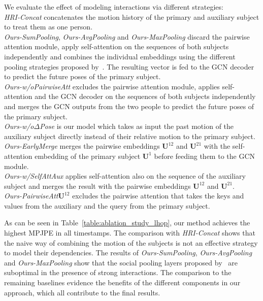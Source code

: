We evaluate the effect of modeling interactions via different strategies: \\
\textit{HRI-Concat} concatenates the motion history of the primary and auxiliary subject to treat them as one person. \\
\textit{Ours-SumPooling}, \textit{Ours-AvgPooling} and \textit{Ours-MaxPooling} discard the pairwise attention module, apply self-attention on the sequences of both subjects independently and combines the individual embeddings using the different pooling strategies proposed by~\cite{Adeli20}. The resulting vector is fed to the GCN decoder to predict the future poses of the primary subject. \\
\textit{Ours-w/oPairwiseAtt} excludes the pairwise attention module, applies self-attention and the GCN decoder on the sequences of both subjects independently and merges the GCN outputs from the two people to predict the future poses of the primary subject. \\
 \textit{Ours-w/o$\Delta$Pose} is our model which takes as input the past motion of the auxiliary subject directly instead of their relative motion to the primary subject.\\
 \textit{Ours-EarlyMerge} merges the pairwise embeddings $\textbf{U}^{12}$ and $\textbf{U}^{21}$ with the self-attention embedding of the primary subject $\textbf{U}^{1}$ before feeding them to the GCN module. \\
\textit{Ours-w/SelfAttAux} applies self-attention also on the sequence of the auxiliary subject and merges the result with the pairwise embeddings $\textbf{U}^{12}$ and $\textbf{U}^{21}$. \\
\textit{Ours-PairwiseAtt$\textbf{U}^{12}$ } excludes the pairwise attention that takes the keys and values from the auxiliary and the query from the primary subject. 
 

As can be seen in Table~\ref{table:ablation_study_lhop}, our method achieves the highest MPJPE in all timestamps. The comparison with \textit{HRI-Concat} shows that the naive way of combining the motion of the subjects is not an effective strategy to model their dependencies. The results of \textit{Ours-SumPooling}, \textit{Ours-AvgPooling} and \textit{Ours-MaxPooling} show that the social pooling layers proposed by~\cite{Adeli20} are suboptimal in the presence of strong interactions. The comparison to the remaining baselines evidence the benefits of the different components in our approach, which all contribute to the final results. 

